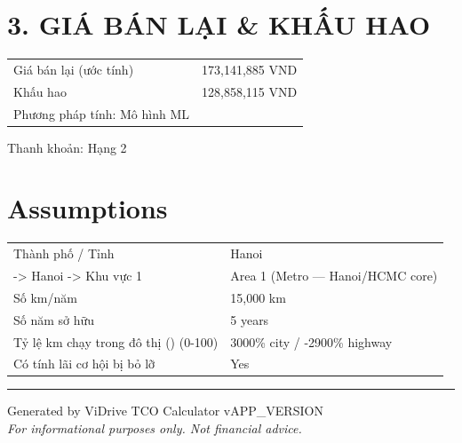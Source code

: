 \documentclass[11pt,a4paper]{article}
\begin{document}
\section*{3. GIÁ BÁN LẠI \& KHẤU HAO}
\begin{tabular}{l r}
\toprule
Giá bán lại (ước tính) & 173,141,885 VND \\
Khấu hao & 128,858,115 VND \\
Phương pháp tính: Mô hình ML &  \\
\bottomrule
\end{tabular}
\vspace{0.3cm}Thanh khoản: Hạng 2

\section*{Assumptions}
\begin{center}
\begin{tabular}{l l}
\toprule
Thành phố / Tỉnh & Hanoi \\
  -> Hanoi -> Khu vực 1 & Area 1 (Metro — Hanoi/HCMC core) \\
Số km/năm & 15,000 km \\
Số năm sở hữu & 5 years \\
  Tỷ lệ km chạy trong đô thị () (0-100) & 3000\% city / -2900\% highway \\
  Có tính lãi cơ hội bị bỏ lỡ & Yes \\
\bottomrule
\end{tabular}
\end{center}
\vspace{0.5cm}
\vspace{1cm}
\hrule
\vspace{0.3cm}
\begin{center}
    {\small Generated by ViDrive TCO Calculator v{APP_VERSION}}\\
    {\small \textit{For informational purposes only. Not financial advice.}}
\end{center}
\end{document}
